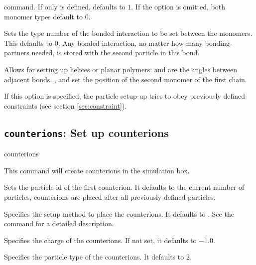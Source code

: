 \begin{arguments}
    command. If only  is defined,
     defaults to $1$. If the option is
    omitted, both monomer types default to $0$.
  \item[\opt{bond \var{bondid}}] Sets the type number of the bonded
    interaction to be set between the monomers. This defaults to $0$.
    Any bonded interaction, no matter how many bonding-partners
    needed, is stored with the second particle in this bond.
  \item[\opt{angle \var{\phi} [\var{\theta} [\var{x} \var{y}
      \var{z}]]}] Allows for setting up helices or planar polymers:
    \var{\phi} and  are the angles between adjacent bonds.
    ,  and  set the position of the second
    monomer of the first chain.
  \item[\opt{constraints}] If this option is specified, the particle setup-up
  tries to obey previously defined constraints (see section \vref{sec:constraint}).
\end{arguments}

\subsection{\texttt{counterions}: Set up counterions}
\begin{essyntax}
  counterions
  \begin{features}
  \end{features}
\end{essyntax}
This command will create  counterions in the simulation box.
\begin{arguments}
\item[\opt{start \var{pid}}] Sets the particle id of the first
  counterion.  It defaults to the current number of particles, \ie
  counterions are placed after all previously defined particles.
\item[\opt{mode \alt{SAW \asep RW} \opt{\var{shield}
      \opt{\var{try_\mathrm{max}} }}}] Specifies the setup method to
  place the counterions. It defaults to . See the
   command for a detailed description.
\item[\opt{charge \var{val}}] Specifies the charge of the counterions.
  If not set, it defaults to $-1.0$.
\item[\opt{type \var{typeid}}] Specifies the particle type of the
  counterions. It defaults to $2$.
\end{arguments}

